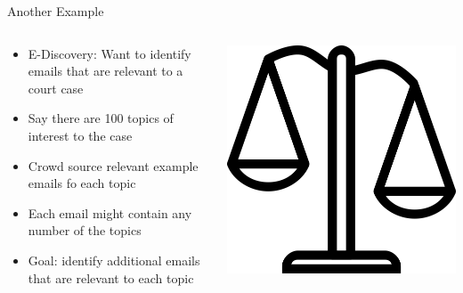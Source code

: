 \documentclass[aspectratio=169]{beamer}
\begin{document}
\begin{frame}{Another Example}

\begin{columns}
\begin{column}{0.6\textwidth}
\begin{itemize}
	\item E-Discovery: Want to identify emails that are relevant to a court case
	\item Say there are 100 topics of interest to the case 
	\item Crowd source relevant example emails fo each topic
	\item Each email might contain any number of the topics
	\item Goal: identify additional emails that are relevant to each topic
\end{itemize}
\end{column}
\begin{column}{0.4\textwidth}
\includegraphics[width=1\textwidth]{lectFF/if_scales_of_Balance_172544.png}
\end{column}
\end{columns}
\end{frame}
\end{document}
